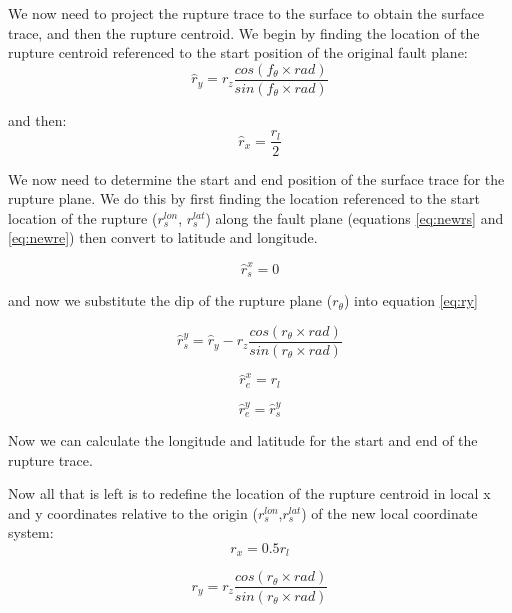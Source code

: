 We now need to project the rupture trace to the surface to obtain the surface trace, and then the rupture centroid. 
We begin by finding the location of the rupture centroid referenced to the start position of the original fault plane:
\begin{equation}\label{eq:ry}
\hat{r}_y = r_z  \frac{cos(f_\theta  \times rad)}{sin(f_\theta \times rad)}
\end{equation}

and then:
\begin{equation}
\hat{r}_x = \frac{r_l}{2}
\end{equation}

We now need to determine the start and end position of the surface trace for the rupture plane. We do this by first 
finding the location referenced to the start location of the rupture ($r_s^{lon}$, $r_s^{lat}$) along the fault 
plane (equations \ref{eq:newrs} and \ref{eq:newre}) then convert to latitude and longitude.

\begin{equation}\label{eq:rsx}
\hat{r}_s^{x} = 0
\end{equation}

and now we substitute the dip of the rupture plane ($r_\theta$) into equation \ref{eq:ry}

\begin{equation}
\hat{r}_s^{y} = \hat{r}_y - r_z  \frac{cos(r_\theta \times rad)}{sin(r_\theta \times rad)}
\end{equation}

\begin{equation}\label{eq:rex}
\hat{r}_e^{x} = r_l
\end{equation}

\begin{equation}\label{eq:rey}
\hat{r}_e^{y} = \hat{r}_s^{y}
\end{equation}

Now we can calculate the longitude and latitude for the start and end of the rupture trace.


Now all that is left is to redefine the location of the rupture centroid in local x and y coordinates relative to the origin 
($r_s^{lon}$,$ r_s^{lat}$) of the new local coordinate system:
\begin{equation}\label{eq:rx}
r_x = 0.5 r_l
\end{equation}

\begin{equation}
r_y = r_z  \frac{cos(r_\theta \times rad)}{sin(r_\theta \times rad)}
\end{equation}

